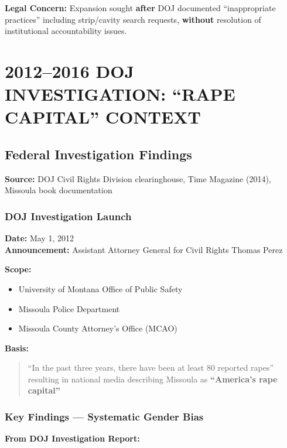 \documentclass[11pt,letterpaper]{article}
\newenvironment{testimony}{%
    \begin{quote}\itshape\color{DarkGray}%
}{%
    \end{quote}%
}
\begin{document}
\textbf{Legal Concern:}
Expansion sought \textbf{after} DOJ documented ``inappropriate practices'' including strip/cavity search requests, \textbf{without} resolution of institutional accountability issues.

\newpage

\section{2012--2016 DOJ INVESTIGATION: ``RAPE CAPITAL'' CONTEXT}

\subsection{Federal Investigation Findings}

\textbf{Source:} DOJ Civil Rights Division clearinghouse, Time Magazine (2014), Missoula book documentation

\subsubsection{DOJ Investigation Launch}

\textbf{Date:} May 1, 2012\\
\textbf{Announcement:} Assistant Attorney General for Civil Rights Thomas Perez

\textbf{Scope:}
\begin{itemize}[leftmargin=*]
\item University of Montana Office of Public Safety
\item Missoula Police Department
\item Missoula County Attorney's Office (MCAO)
\end{itemize}

\textbf{Basis:}
\begin{testimony}
``In the past three years, there have been at least 80 reported rapes'' resulting in national media describing Missoula as \textbf{``America's rape capital''}
\end{testimony}

\subsubsection{Key Findings --- Systematic Gender Bias}

\textbf{From DOJ Investigation Report:}
\end{document}

